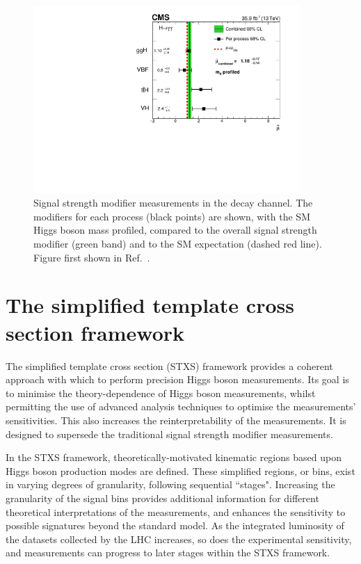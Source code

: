\begin{figure}[hptb]
  \centering
  \includegraphics[width=0.9\textwidth]{Figures/Theory/PerProcTrad.pdf}
  \caption[Per process signal strength modifier measurements from Ref.~\cite{HIG-16-040}.]
  {
    Signal strength modifier measurements in the \Hgg decay channel.
    The modifiers for each process (black points) are shown, with the SM Higgs boson mass profiled, 
    compared to the overall signal strength modifier (green band) 
    and to the SM expectation (dashed red line).
    Figure first shown in Ref.~\cite{HIG-16-040}.
  }
  \label{fig:theory_PerProcTrad}
\end{figure}

\section{The simplified template cross section framework}

The simplified template cross section (STXS) framework \cite{YR4}
provides a coherent approach with which to perform precision Higgs boson measurements. 
Its goal is to minimise the theory-dependence of Higgs boson measurements, 
whilst permitting the use of advanced analysis techniques to optimise the measurements' sensitivities.
This also increases the reinterpretability of the measurements.
It is designed to supersede the traditional signal strength modifier measurements.

In the STXS framework, 
theoretically-motivated kinematic regions based upon Higgs boson production modes are defined.
These simplified regions, or bins, exist in varying degrees of granularity, 
following sequential ``stages".
Increasing the granularity of the signal bins 
provides additional information for different theoretical interpretations of the measurements, 
and enhances the sensitivity to possible signatures beyond the standard model.
As the integrated luminosity of the datasets collected by the LHC increases, 
so does the experimental sensitivity,
and measurements can progress to later stages within the STXS framework.

